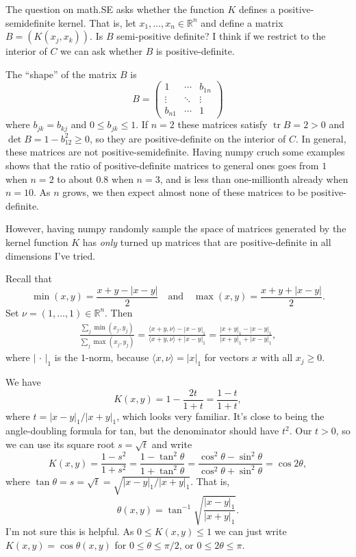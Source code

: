 \documentclass[11pt]{amsart}
\theoremstyle{definition}
\newcommand{\kk}[1]{\mathbb{#1}}
\def\qandq{\quad\text{and}\quad}
\DeclareMathOperator{\tr}{tr}
\begin{document}
The question on math.SE asks whether the function $K$ defines a positive-semidefinite kernel. That is, let $x_1, \ldots, x_n \in \kk R^n$ and define a matrix $B = (K(x_j,x_k))$. Is $B$ semi-positive definite? I think if we restrict to the interior of $C$ we can ask whether $B$ is positive-definite.

The ``shape'' of the matrix $B$ is
\[
B =
\begin{pmatrix}
1  & \cdots & b_{1n}
\\
\vdots & \ddots & \vdots
\\
b_{n1} & \cdots & 1
\end{pmatrix}
\]
where $b_{jk} = b_{kj}$ and $0 \leq b_{jk} \leq 1$. If $n = 2$ these matrices satisfy $\tr B = 2 > 0$ and $\det B = 1 - b_{12}^2 \geq 0$, so they are positive-definite on the interior of $C$. In general, these matrices are not positive-semidefinite. Having numpy cruch some examples shows that the ratio of positive-definite matrices to general ones goes from $1$ when $n = 2$ to about $0.8$ when $n = 3$, and is less than one-millionth already when $n = 10$. As $n$ grows, we then expect almost none of these matrices to be positive-definite.

However, having numpy randomly sample the space of matrices generated by the kernel function $K$ has \emph{only} turned up matrices that are positive-definite in all dimensions I've tried.

Recall that
\[
\min(x,y) = \frac{x + y - |x - y|}{2}
\qandq
\max(x,y) = \frac{x + y + |x - y|}{2}.
\]
Set $\nu = (1,\ldots,1) \in \kk R^n$. Then
\begin{align*}
\frac{\sum_j \min(x_j,y_j)}{\sum_j \max(x_j,y_j)}
= \frac{\langle x + y, \nu \rangle - |x-y|_1}{\langle x + y, \nu \rangle + |x-y|_1}
= \frac{|x+y|_1 - |x-y|_1}{|x+y|_1 + |x-y|_1},
\end{align*}
where $|\,\cdot\,|_1$ is the $1$-norm, because $\langle x, \nu \rangle = |x|_1$ for vectors $x$ with all $x_j \geq 0$.

We have
\[
K(x,y)
= 1 - \frac{2 t}{1 + t} = \frac{1-t}{1+t},
\]
where $t = |x-y|_1/|x+y|_1$, which looks very familiar. It's close to being the angle-doubling formula for tan, but the denominator should have $t^2$. Our $t > 0$, so we can use its square root $s = \sqrt t$ and write
\[
K(x,y) = \frac{1-s^2}{1+s^2}
= \frac{1-\tan^2 \theta}{1 + \tan^2 \theta}
= \frac{\cos^2\theta - \sin^2\theta}{\cos^2\theta + \sin^2 \theta}
= \cos 2\theta,
\]
where $\tan \theta = s = \sqrt t = \sqrt{|x-y|_1 / |x+y|_1}$.
That is,
\[
\theta(x,y) = \tan^{-1} \sqrt{\frac{|x-y|_1}{|x+y|_1}}.
\]
I'm not sure this is helpful. As $0 \leq K(x,y) \leq 1$ we can just write $K(x,y) = \cos \theta(x,y)$ for $0 \leq \theta \leq \pi/2$, or $0 \leq 2\theta \leq \pi$.
\end{document}
